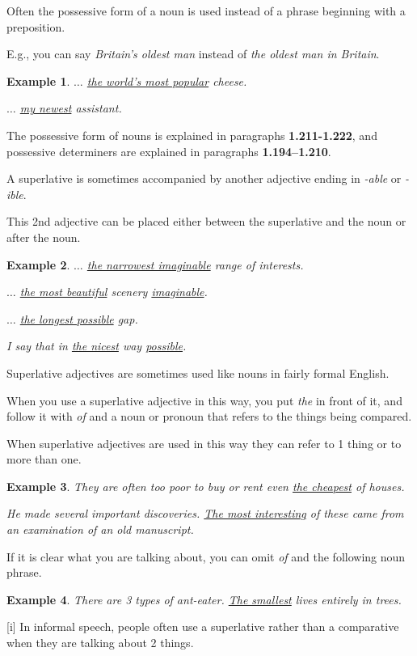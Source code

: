 \documentclass[oneside]{book}
\numberwithin{equation}{section}
\newtheorem{example}{Example}[section]
\begin{document}
Often the possessive form of a noun is used instead of a phrase beginning with a preposition.

E.g., you can say \textit{Britain's oldest man} instead of \textit{the oldest man in Britain}.
\begin{example}
    $\ldots$ \underline{the world's most popular} cheese.
    
    $\ldots$ \underline{my newest} assistant.
\end{example}
The possessive form of nouns is explained in paragraphs \textbf{1.211-1.222}, and possessive determiners are explained in paragraphs \textbf{1.194--1.210}.

%
\noindent{} A superlative is sometimes accompanied by another adjective ending in \textit{-able} or \textit{-ible}.

This 2nd adjective can be placed either between the superlative and the noun or after the noun.
\begin{example}
    $\ldots$ \underline{the narrowest imaginable} range of interests.
    
    $\ldots$ \underline{the most beautiful} scenery \underline{imaginable}.
    
    $\ldots$ \underline{the longest possible} gap.
    
    I say that in \underline{the nicest} way \underline{possible}.
\end{example}
%
\noindent{} Superlative adjectives are sometimes used like nouns in fairly formal English.

When you use a superlative adjective in this way, you put \textit{the} in front of it, and follow it with \textit{of} and a noun or pronoun that refers to the things being compared.

When superlative adjectives are used in this way they can refer to 1 thing or to more than one.
\begin{example}
    They are often too poor to buy or rent even \underline{the cheapest} of houses.
    
    He made several important discoveries. \underline{The most interesting} of these came from an examination of an old manuscript.
\end{example}
If it is clear what you are talking about, you can omit \textit{of} and the following noun phrase.
\begin{example}
    There are 3 types of ant-eater. \underline{The smallest} lives entirely in trees.
\end{example}
%
\noindent{} [i] In informal speech, people often use a superlative rather than a comparative when they are talking about 2 things.
\end{document}
